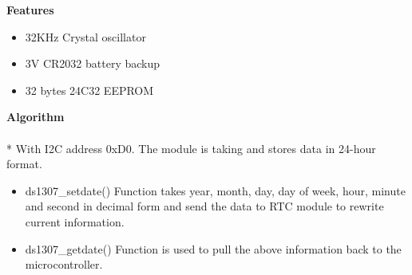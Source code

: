 \Large \textbf{Features}
\normalsize
\begin{itemize}
  \item 32KHz Crystal oscillator 
  \item 3V CR2032 battery backup
  \item 32 bytes 24C32 EEPROM	
\end{itemize}
\Large \textbf{Algorithm}\\[0.1cm]
\\*
\normalsize{With I2C address 0xD0. The module is taking and stores data in 24-hour format.}
\begin{itemize}
  \item ds1307\_setdate() Function takes year, month, day, day of week, hour, minute and second in decimal form and send the data to RTC module to rewrite current information. 
  \item ds1307\_getdate() Function is used to pull the above information back to the microcontroller.
\end{itemize}

\begin{minipage}{0.97\textwidth}
 \noindent{}\hfill
\end{minipage}




